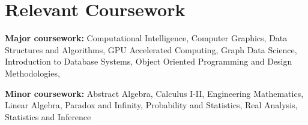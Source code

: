\section{Relevant Coursework}
\vspace{2pt}
\resumeSubHeadingListStart
{\item{
                  \textbf{Major coursework:}{
                        Computational Intelligence,
                        Computer Graphics,
                        Data Structures and Algorithms,
                        GPU Accelerated Computing,
                        Graph Data Science,
                        Introduction to Database Systems,
                        Object Oriented Programming and Design Methodologies,
                  } \\ \vspace{3pt}

                  \textbf{Minor coursework:}{
                        Abstract Algebra,
                        Calculus I-II,
                        Engineering Mathematics,
                        Linear Algebra,
                        Paradox and Infinity,
                        Probability and Statistics,
                        Real Analysis,
                        Statistics and Inference
                  }
            }}
\resumeSubHeadingListEnd
